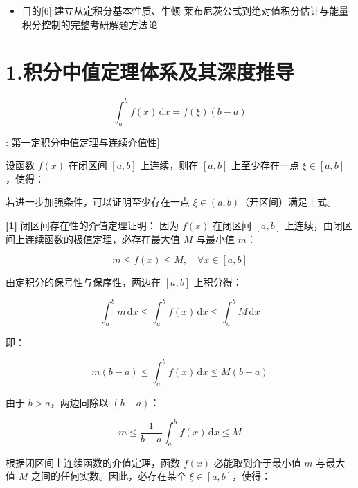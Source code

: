 \documentclass[11pt,a4paper,UTF8]{ctexart}
\begin{document}
\begin{targetbox}[本章复习目标与核心知识图谱]
\begin{itemize}
  \item 目的[6]:建立从定积分基本性质、牛顿-莱布尼茨公式到绝对值积分估计与能量积分控制的完整考研解题方法论
\end{itemize}
\end{targetbox}


\section{1.积分中值定理体系及其深度推导}


\begin{equation*}
\int_a^b f(x)\,\mathrm{d}x = f(\xi)(b-a)
\end{equation*}
\begin{thmbox}[定理[1]: 第一定积分中值定理与连续介值性]

设函数 $f(x)$ 在闭区间 $[a, b]$ 上连续，则在 $[a, b]$ 上至少存在一点 $\xi \in [a, b]$，使得：


若进一步加强条件，可以证明至少存在一点 $\xi \in (a, b)$（开区间）满足上式。

\textbf{[1]} 闭区间存在性的介值定理证明：
因为 $f(x)$ 在闭区间 $[a, b]$ 上连续，由闭区间上连续函数的极值定理，必存在最大值 $M$ 与最小值 $m$：


\begin{equation*}
m \leqslant f(x) \leqslant M, \quad \forall x \in [a, b]
\end{equation*}


由定积分的保号性与保序性，两边在 $[a, b]$ 上积分得：


\begin{equation*}
\int_a^b m\,\mathrm{d}x \leqslant \int_a^b f(x)\,\mathrm{d}x \leqslant \int_a^b M\,\mathrm{d}x
\end{equation*}


即：


\begin{equation*}
m(b-a) \leqslant \int_a^b f(x)\,\mathrm{d}x \leqslant M(b-a)
\end{equation*}


由于 $b > a$，两边同除以 $(b-a)$：


\begin{equation*}
m \leqslant \frac{1}{b-a}\int_a^b f(x)\,\mathrm{d}x \leqslant M
\end{equation*}


根据闭区间上连续函数的介值定理，函数 $f(x)$ 必能取到介于最小值 $m$ 与最大值 $M$ 之间的任何实数。因此，必存在某个 $\xi \in [a, b]$，使得：



\end{thmbox}
\end{document}
